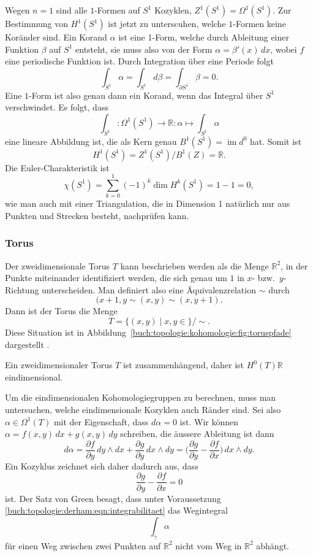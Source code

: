 Wegen $n=1$ sind
alle $1$-Formen auf $S^1$ Kozyklen, $Z^1(S^1)=\Omega^1(S^1)$.
Zur Bestimmung von $H^1(S^1)$ ist jetzt zu unterscuhen,
welche $1$-Formen keine Koränder sind.
Ein Korand $\alpha$ ist eine 1-Form, welche durch Ableitung einer
Funktion $\beta$ auf $S^1$ entsteht, sie muss also von der Form
$\alpha=\beta'(x)\,dx$, wobei $f$ eine periodische Funktion ist.
Durch Integration über eine Periode folgt
\[
\int_{S^1} \alpha
=
\int_{S^1} d\beta
=
\int_{\partial S^1} \beta
=
0.
\]
Eine $1$-Form ist also genau dann ein Korand, wenn das Integral
über $S^1$ verschwindet.
Es folgt, dass
\[
\int_{S^1}
\colon
\Omega^1(S^1)\to \mathbb{R}
:
\alpha
\mapsto
\int_{S^1}\alpha
\]
eine lineare Abbildung ist, die als Kern genau
$B^1(S^1)=\operatorname{im}d^0$ hat.
Somit ist
\[
H^1(S^1)
=
Z^1(S^1) / B^1(Z)
=
\mathbb{R}.
\]
Die Euler-Charakteristik ist
\[
\chi(S^1)
=
\sum_{k=0}^1 (-1)^k\dim H^k(S^1)
=
1-1
=
0,
\]
wie man auch mit einer Triangulation, die in Dimension 1 natürlich nur
aus Punkten und Strecken besteht, nachprüfen kann.

%
%
\subsubsection{Torus}

Der zweidimensionale Torus $T$ kann beschrieben werden als die
Menge $\mathbb{R}^2$, in der Punkte miteinander identifiziert
werden, die sich genau um $1$ in $x$- bzw.~$y$-Richtung unterscheiden.
Man definiert also eine Äquivalenzrelation $\sim$ durch
\[
(x+1,y \sim (x,y) \sim (x,y+1).
\]
Dann ist der Torus die Menge
\[
T
=
\{ (x,y) \mid x,y\in\mathbb\}
/
\sim.
\]
Diese Situation ist in
Abbildung~\ref{buch:topologie:kohomologie:fig:toruspfade}
dargestellt .

Ein zweidimensionaler Torus $T$ ist zusammenhängend, daher ist
$H^0(T)\mathbb{R}$ eindimensional.

Um die eindimensionalen Kohomologiegruppen zu berechnen, muss man
untersuchen, welche eindimensionale Kozyklen auch Ränder sind.
Sei also $\alpha\in \Omega^1(T)$ mit der Eigenschaft, dass $d\alpha=0$
ist.
Wir können $\alpha = f(x,y)\,dx + g(x,y)\,dy$ schreiben, die äussere Ableitung
ist dann
\[
d\alpha
=
\frac{\partial f}{\partial y}\,dy\wedge dx
+
\frac{\partial g}{\partial y}\,dx\wedge dy
=
\biggl(\frac{\partial g}{\partial y}-\frac{\partial f}{\partial x}\biggr)
\,dx\wedge dy.
\]
Ein Kozyklus zeichnet sich daher dadurch aus, dass
\begin{equation}
\frac{\partial g}{\partial y}-\frac{\partial f}{\partial x}
=
0
\label{buch:topologie:derham:eqn:integrabilitaet}
\end{equation}
ist.
Der Satz von Green besagt, dass unter Voraussetzung
\eqref{buch:topologie:derham:eqn:integrabilitaet}
das Wegintegral
\[
\int_\gamma \alpha
\]
für einen Weg zwischen zwei Punkten auf $\mathbb{R}^2$ nicht vom Weg
in $\mathbb{R}^2$ abhängt.

